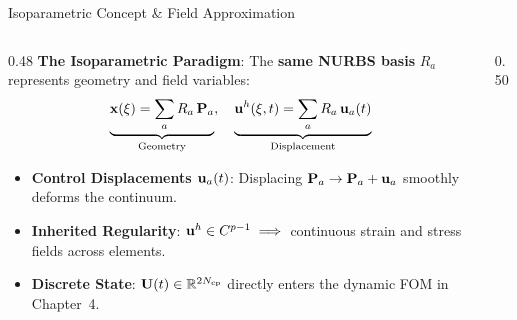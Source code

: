 \begin{frame}{Isoparametric Concept \& Field Approximation}
  \begin{columns}[T]
    \begin{column}{0.48\textwidth}
      \small
      \textbf{The Isoparametric Paradigm}:
      The \textbf{same NURBS basis} $R_a$ represents geometry and field variables:
      \[
        \underbrace{\mathbf{x}(\xi) = \sum_a R_a\,\mathbf{P}_a}_{\text{\scriptsize Geometry}}, \quad
        \underbrace{\mathbf{u}^h(\xi, t) = \sum_a R_a\,\mathbf{u}_a(t)}_{\text{\scriptsize Displacement}}
      \]
      \vspace{-0.25cm}
      \begin{itemize}
        \footnotesize
        \setlength{\itemsep}{0.1cm}
        \item \textbf{Control Displacements $\mathbf{u}_a(t)$}: Displacing $\mathbf{P}_a \to \mathbf{P}_a + \mathbf{u}_a$ smoothly deforms the continuum.
        \item \textbf{Inherited Regularity}: $\mathbf{u}^h \in C^{p-1} \implies$ continuous strain and stress fields across elements.
        \item \textbf{Discrete State}: $\mathbf{U}(t) \in \mathbb{R}^{2N_{\text{cp}}}$ directly enters the dynamic FOM in Chapter~4.
      \end{itemize}
    \end{column}

    \begin{column}{0.50\textwidth}
      \centering
\end{column}
\end{columns}
\end{frame}
